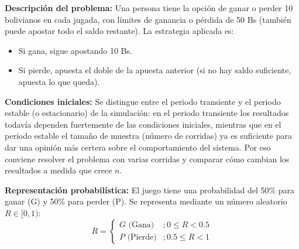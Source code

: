 \documentclass{article}
\begin{document}
\textbf{Descripción del problema:}
Una persona tiene la opción de ganar o perder 10 bolivianos en cada jugada, con límites de ganancia o pérdida de 50 Bs (también puede apostar todo el saldo restante). La estrategia aplicada es:
\begin{itemize}
    \item Si gana, sigue apostando 10 Bs.
    \item Si pierde, apuesta el doble de la apuesta anterior (si no hay saldo suficiente, apuesta lo que queda).
\end{itemize}

\textbf{Condiciones iniciales:}
Se distingue entre el periodo transiente y el periodo estable (o estacionario) de la simulación: en el periodo transiente los resultados todavía dependen fuertemente de las condiciones iniciales, mientras que en el periodo estable el tamaño de muestra (número de corridas) ya es suficiente para dar una opinión más certera sobre el comportamiento del sistema. Por eso conviene resolver el problema con varias corridas y comparar cómo cambian los resultados a medida que crece $n$.

\textbf{Representación probabilística:}
El juego tiene una probabilidad del 50\% para ganar (G) y 50\% para perder (P). Se representa mediante un número aleatorio $R \in [0,1)$:
$$
R = \begin{cases} 
G \text{ (Gana)} &; 0 \leq R < 0.5 \\
P \text{ (Pierde)} &; 0.5 \leq R < 1 
\end{cases}
$$

\begin{table}[htbp]
\centering
\small
{}
\end{table}
\end{document}
